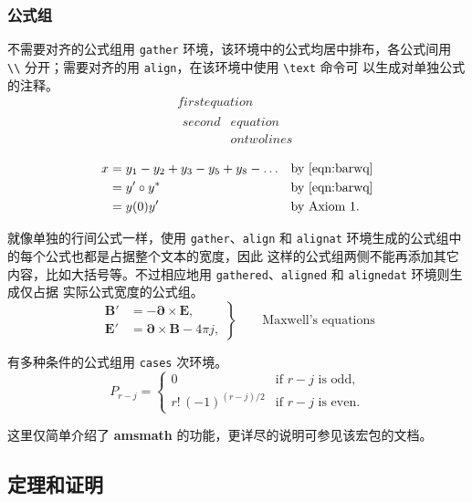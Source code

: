 \subsubsection{公式组}

不需要对齐的公式组用 \texttt{gather} 环境，该环境中的公式均居中排布，各公式间用
\verb|\\| 分开；需要对齐的用 \texttt{align}，在该环境中使用 \verb|\text| 命令可
以生成对单独公式的注释。
\begin{gather}
  first equation\\
  \begin{split}
    second & equation\\
           & on twolines
  \end{split}
\end{gather}

\begin{align}
 x & = y_1-y_2+y_3-y_5+y_8-\dots && \text{by \eqref{eqn:barwq}}\\
   & = y'\circ y^*               && \text{by \eqref{eqn:barwq}}\\
   & = y(0) y'                   && \text{by Axiom 1.}
\end{align}

就像单独的行间公式一样，使用 \texttt{gather}、\texttt{align} 和
\texttt{alignat} 环境生成的公式组中的每个公式也都是占据整个文本的宽度，因此
这样的公式组两侧不能再添加其它内容，比如大括号等。不过相应地用
\texttt{gathered}、\texttt{aligned} 和 \texttt{alignedat} 环境则生成仅占据
实际公式宽度的公式组。
\begin{equation*}
\left. \begin{aligned}
  \bm{B'}&=-\bm{\partial}\times \bm{E},\\
  \bm{E'}&=\bm{\partial}\times \bm{B} - 4\pi j,
\end{aligned}
\right\}
\qquad \text{Maxwell's equations}
\end{equation*}

有多种条件的公式组用 \texttt{cases} 次环境。
\[ P_{r-j}=\begin{cases}
  0& \text{if $r-j$ is odd},\\
  r!\,(-1)^{(r-j)/2}& \text{if $r-j$ is even}.
\end{cases} \]

这里仅简单介绍了 \textbf{amsmath} 的功能，更详尽的说明可参见该宏包的文档。

\subsection{定理和证明}

